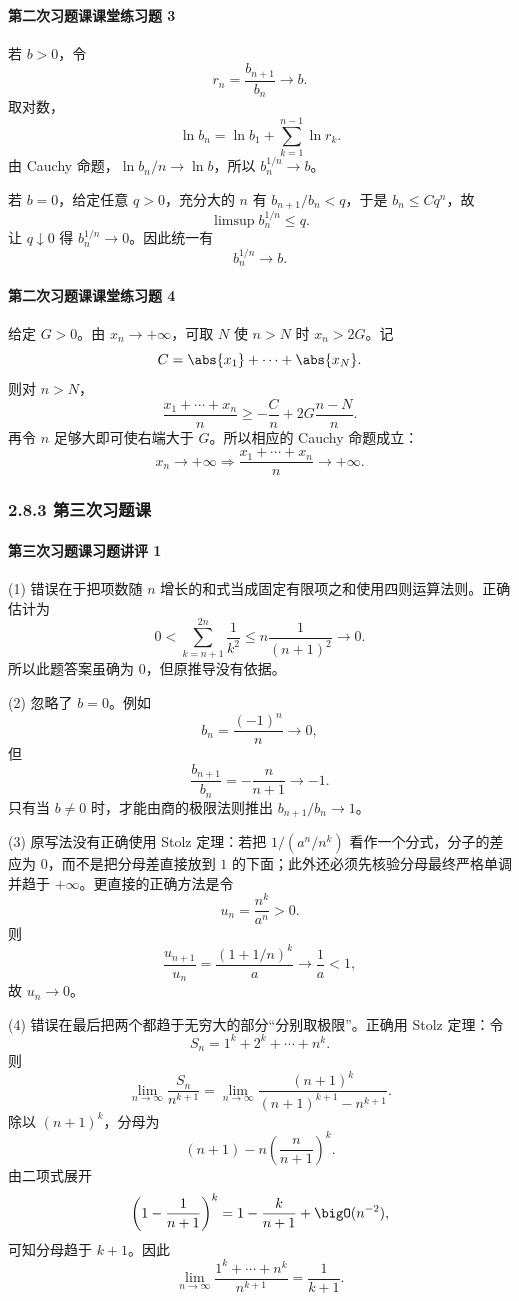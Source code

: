 \paragraph{第二次习题课课堂练习题 3}
\begin{xsolution}
若 $b>0$，令
\[
  r_n=\frac{b_{n+1}}{b_n}\to b.
\]
取对数，
\[
  \ln b_n=\ln b_1+\sum_{k=1}^{n-1}\ln r_k.
\]
由 Cauchy 命题，$\ln b_n/n\to\ln b$，所以 $b_n^{1/n}\to b$。

若 $b=0$，给定任意 $q>0$，充分大的 $n$ 有 $b_{n+1}/b_n<q$，于是 $b_n\le Cq^n$，故
\[
  \limsup b_n^{1/n}\le q.
\]
让 $q\downarrow0$ 得 $b_n^{1/n}\to0$。因此统一有
\[
  \boxed{b_n^{1/n}\to b}.
\]
\end{xsolution}

\paragraph{第二次习题课课堂练习题 4}
\begin{xsolution}
给定 $G>0$。由 $x_n\to+\infty$，可取 $N$ 使 $n>N$ 时 $x_n>2G$。记
\[
  C=\abs{x_1}+\cdots+\abs{x_N}.
\]
则对 $n>N$，
\[
  \frac{x_1+\cdots+x_n}{n}
  \ge-\frac Cn+2G\frac{n-N}{n}.
\]
再令 $n$ 足够大即可使右端大于 $G$。所以相应的 Cauchy 命题成立：
\[
  \boxed{x_n\to+\infty\Longrightarrow
  \frac{x_1+\cdots+x_n}{n}\to+\infty}.
\]
\end{xsolution}

\subsubsection*{2.8.3 第三次习题课}

\paragraph{第三次习题课习题讲评 1}
\begin{xsolution}
(1) 错误在于把项数随 $n$ 增长的和式当成固定有限项之和使用四则运算法则。正确估计为
\[
  0<\sum_{k=n+1}^{2n}\frac1{k^2}
  \le n\frac1{(n+1)^2}\to0.
\]
所以此题答案虽确为 $0$，但原推导没有依据。

(2) 忽略了 $b=0$。例如
\[
  b_n=\frac{(-1)^n}{n}\to0,
\]
但
\[
  \frac{b_{n+1}}{b_n}=-\frac n{n+1}\to-1.
\]
只有当 $b\ne0$ 时，才能由商的极限法则推出 $b_{n+1}/b_n\to1$。

(3) 原写法没有正确使用 Stolz 定理：若把 $1/(a^n/n^k)$ 看作一个分式，分子的差应为 $0$，而不是把分母差直接放到 $1$ 的下面；此外还必须先核验分母最终严格单调并趋于 $+\infty$。更直接的正确方法是令
\[
  u_n=\frac{n^k}{a^n}>0.
\]
则
\[
  \frac{u_{n+1}}{u_n}=\frac{(1+1/n)^k}{a}\to\frac1a<1,
\]
故 $u_n\to0$。

(4) 错误在最后把两个都趋于无穷大的部分“分别取极限”。正确用 Stolz 定理：令
\[
  S_n=1^k+2^k+\cdots+n^k.
\]
则
\[
  \lim_{n\to\infty}\frac{S_n}{n^{k+1}}
  =\lim_{n\to\infty}
  \frac{(n+1)^k}{(n+1)^{k+1}-n^{k+1}}.
\]
除以 $(n+1)^k$，分母为
\[
  (n+1)-n\left(\frac n{n+1}\right)^k.
\]
由二项式展开
\[
  \left(1-\frac1{n+1}\right)^k
  =1-\frac{k}{n+1}+\bigO(n^{-2}),
\]
可知分母趋于 $k+1$。因此
\[
  \boxed{\lim_{n\to\infty}\frac{1^k+\cdots+n^k}{n^{k+1}}
  =\frac1{k+1}}.
\]
\end{xsolution}

